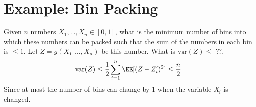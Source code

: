 \section{Example: Bin Packing}
Given $n$ numbers $X_1, \dots, X_n \in [0,1]$, what is the minimum number of bins into which these numbers can be packed such that the sum of the numbers in each bin is $\leq 1$. Let $Z = g(X_1, \dots, X_n)$ be this number. What is $\text{var}(Z) \leq $ ??. 
\begin{align*}
    \text{var}(Z) \leq \frac{1}{2} \sum_{i=1}^n \EE[(Z - Z_i')^2] \leq \frac{n}{2}
\end{align*}
Since at-most the number of bins can change by $1$ when the variable $X_i$ is changed.